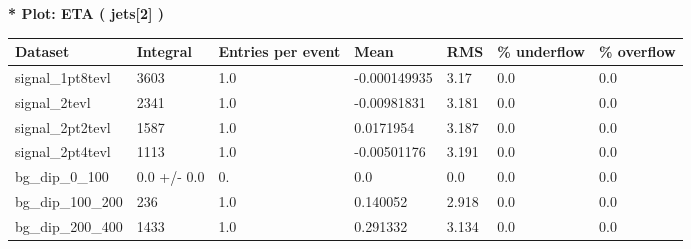 \documentclass[a4paper, 10pt]{article}
\begin{document}
\textbf{* Plot: ETA ( jets[2] ) }\\
   \begin{table}[H]
  \begin{center}
    \begin{tabular}{|m{23.0mm}|m{23.0mm}|m{18.0mm}|m{19.0mm}|m{19.0mm}|m{19.0mm}|m{19.0mm}|}
      \hline
      {\cellcolor{yellow}         Dataset}& {\cellcolor{yellow}         Integral}& {\cellcolor{yellow}         Entries per event}& {\cellcolor{yellow}         Mean}& {\cellcolor{yellow}         RMS}& {\cellcolor{yellow}         \% underflow}& {\cellcolor{yellow}         \% overflow}\\
      \hline
      {\cellcolor{white}         signal\_1pt8tevl}& {\cellcolor{white}         3603}& {\cellcolor{white}         1.0}& {\cellcolor{white}         -0.000149935}& {\cellcolor{white}         3.17}& {\cellcolor{green}         0.0}& {\cellcolor{green}         0.0}\\
      \hline
      {\cellcolor{white}         signal\_2tevl}& {\cellcolor{white}         2341}& {\cellcolor{white}         1.0}& {\cellcolor{white}         -0.00981831}& {\cellcolor{white}         3.181}& {\cellcolor{green}         0.0}& {\cellcolor{green}         0.0}\\
      \hline
      {\cellcolor{white}         signal\_2pt2tevl}& {\cellcolor{white}         1587}& {\cellcolor{white}         1.0}& {\cellcolor{white}         0.0171954}& {\cellcolor{white}         3.187}& {\cellcolor{green}         0.0}& {\cellcolor{green}         0.0}\\
      \hline
      {\cellcolor{white}         signal\_2pt4tevl}& {\cellcolor{white}         1113}& {\cellcolor{white}         1.0}& {\cellcolor{white}         -0.00501176}& {\cellcolor{white}         3.191}& {\cellcolor{green}         0.0}& {\cellcolor{green}         0.0}\\
      \hline
      {\cellcolor{white}         bg\_dip\_0\_100}& {\cellcolor{white}         0.0 +/\-- 0.0}& {\cellcolor{white}         0.}& {\cellcolor{white}         0.0}& {\cellcolor{white}         0.0}& {\cellcolor{green}         0.0}& {\cellcolor{green}         0.0}\\
      \hline
      {\cellcolor{white}         bg\_dip\_100\_200}& {\cellcolor{white}         236}& {\cellcolor{white}         1.0}& {\cellcolor{white}         0.140052}& {\cellcolor{white}         2.918}& {\cellcolor{green}         0.0}& {\cellcolor{green}         0.0}\\
      \hline
      {\cellcolor{white}         bg\_dip\_200\_400}& {\cellcolor{white}         1433}& {\cellcolor{white}         1.0}& {\cellcolor{white}         0.291332}& {\cellcolor{white}         3.134}& {\cellcolor{green}         0.0}& {\cellcolor{green}         0.0}\\

\end{tabular}
\end{center}
\end{table}
\end{document}
